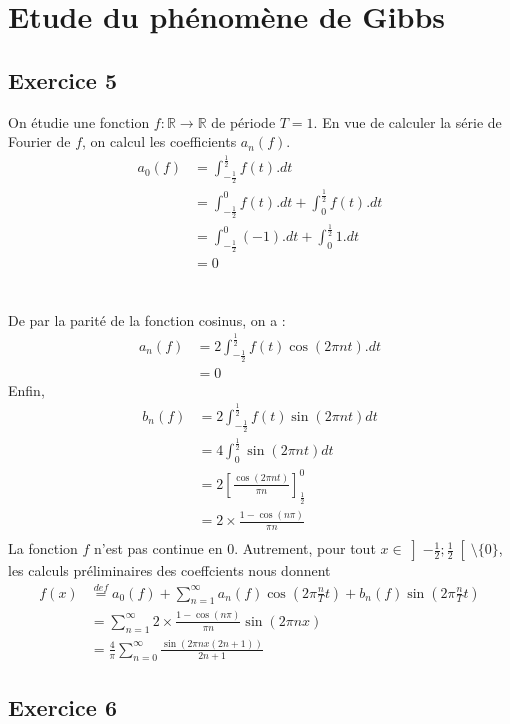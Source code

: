 \documentclass[a4paper,12pt]{article}
\begin{document}
\section{ Etude du phénomène de Gibbs}

\subsection{ Exercice 5}
On étudie une fonction $f: \mathbb{R} \rightarrow \mathbb{R}$ de période $T = 1$. En vue de calculer la série de Fourier de $f$, on calcul les coefficients $a_n(f)$.
\begin{align*}
  a_0(f)
  &=\int_{-\frac{1}{2}}^{\frac{1}{2}}f(t).dt\\
  &=\int_{-\frac{1}{2}}^{0}f(t).dt + \int_{0}^{\frac{1}{2}}f(t).dt\\
  &=\int_{-\frac{1}{2}}^{0}(-1).dt + \int_{0}^{\frac{1}{2}}1.dt \\
  &= 0
\end{align*}\\\\
De par la parité de la fonction cosinus, on a :
\begin{align*}
  a_n(f)
  &=2\int_{-\frac{1}{2}}^{\frac{1}{2}}f(t)\cos(2\pi nt).dt\\
  &=0
\end{align*}
Enfin,
\begin{align*}
  b_n(f)
  &=2\int_{-\frac{1}{2}}^{\frac{1}{2}}f(t)\sin(2\pi nt)dt\\
  &=4\int_0^{\frac{1}{2}}\sin(2\pi nt)dt\\
  &=2\left[\frac{\cos(2\pi nt)}{\pi n}\right]_{\frac{1}{2}}^0\\
  &=2\times\frac{1 - \cos(n\pi)}{\pi n}\\
\end{align*}
La fonction $f$ n'est pas continue en $0$. Autrement, pour tout $x \in \left]-\frac{1}{2};\frac{1}{2}\right[\setminus\{0\}$, les calculs préliminaires des coeffcients nous donnent
\begin{align*}
  f(x)
  &\overset{def}{=}a_{0}(f) + \sum_{n=1}^{\infty} a_{n}(f)\cos\left(2\pi\frac{n}{T}t\right) + b_{n}(f)\sin\left(2\pi\frac{n}{T}t\right)\\
  &=\sum_{n=1}^\infty2\times\frac{1 - \cos(n\pi)}{\pi n}\sin(2\pi nx)\\
  &=\frac{4}{\pi}\sum_{n=0}^\infty\frac{\sin(2\pi nx(2n+1))}{2n+1}
\end{align*}

\newpage
\subsection{ Exercice 6}
\end{document}
